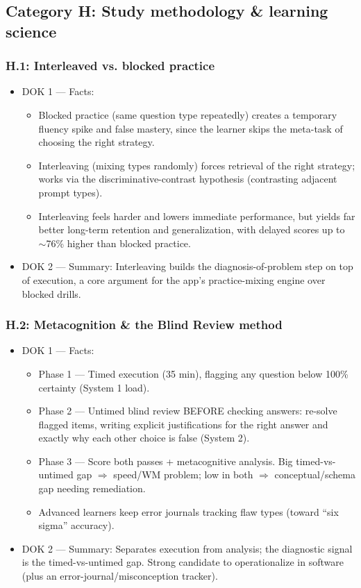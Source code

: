 \documentclass[11pt]{article}
\begin{document}
\subsection*{Category H: Study methodology \& learning science}
\subsubsection*{H.1: Interleaved vs. blocked practice}
\begin{itemize}
\item DOK 1 --- Facts:
\begin{itemize}
\item Blocked practice (same question type repeatedly) creates a temporary fluency spike and false mastery, since the learner skips the meta-task of choosing the right strategy.
\item Interleaving (mixing types randomly) forces retrieval of the right strategy; works via the discriminative-contrast hypothesis (contrasting adjacent prompt types).
\item Interleaving feels harder and lowers immediate performance, but yields far better long-term retention and generalization, with delayed scores up to $\sim$76\% higher than blocked practice.
\end{itemize}
\item DOK 2 --- Summary: Interleaving builds the diagnosis-of-problem step on top of execution, a core argument for the app's practice-mixing engine over blocked drills.
\end{itemize}
\subsubsection*{H.2: Metacognition \& the Blind Review method}
\begin{itemize}
\item DOK 1 --- Facts:
\begin{itemize}
\item Phase 1 --- Timed execution (35 min), flagging any question below 100\% certainty (System 1 load).
\item Phase 2 --- Untimed blind review BEFORE checking answers: re-solve flagged items, writing explicit justifications for the right answer and exactly why each other choice is false (System 2).
\item Phase 3 --- Score both passes + metacognitive analysis. Big timed-vs-untimed gap $\Rightarrow$ speed/WM problem; low in both $\Rightarrow$ conceptual/schema gap needing remediation.
\item Advanced learners keep error journals tracking flaw types (toward \enquote{six sigma} accuracy).
\end{itemize}
\item DOK 2 --- Summary: Separates execution from analysis; the diagnostic signal is the timed-vs-untimed gap. Strong candidate to operationalize in software (plus an error-journal/misconception tracker).
\end{itemize}
\end{document}
